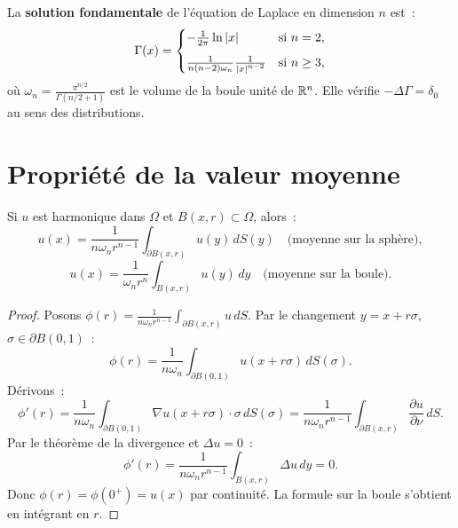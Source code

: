 \begin{theoreme}
La \textbf{solution fondamentale} de l'\'equation de Laplace en dimension $n$
est~:
\begin{equation}\label{eq:sol_fondamentale_laplace}
    \Gamma(x) = \begin{cases}
        -\frac{1}{2\pi}\ln\left| x \right| & \text{si } n = 2,\\[6pt]
        \frac{1}{n(n-2)\omega_n}\frac{1}{\left| x \right|^{n-2}} & \text{si } n \geq 3,
    \end{cases}
\end{equation}
o\`u $\omega_n = \frac{\pi^{n/2}}{\Gamma(n/2+1)}$ est le volume de la boule
unit\'e de $\mathbb{R}^n$. Elle v\'erifie $-\Delta\Gamma = \delta_0$ au sens des
distributions.
\end{theoreme}

\section{Propri\'et\'e de la valeur moyenne}

\begin{theoreme}
Si $u$ est harmonique dans $\Omega$ et $B(x,r) \subset \Omega$, alors~:
\begin{equation}\label{eq:valeur_moyenne_sphere}
    u(x) = \frac{1}{n\omega_n r^{n-1}}\int_{\partial B(x,r)} u(y)\, dS(y)
    \quad \text{(moyenne sur la sph\`ere)},
\end{equation}
\begin{equation}\label{eq:valeur_moyenne_boule}
    u(x) = \frac{1}{\omega_n r^n}\int_{B(x,r)} u(y)\, dy
    \quad \text{(moyenne sur la boule)}.
\end{equation}
\end{theoreme}

\begin{proof}
Posons $\phi(r) = \frac{1}{n\omega_n r^{n-1}}\int_{\partial B(x,r)} u\, dS$.
Par le changement $y = x + r\sigma$, $\sigma \in \partial B(0,1)$~:
\[
    \phi(r) = \frac{1}{n\omega_n}\int_{\partial B(0,1)} u(x+r\sigma)\, dS(\sigma).
\]
D\'erivons~:
\[
    \phi'(r) = \frac{1}{n\omega_n}\int_{\partial B(0,1)}
    \nabla u(x+r\sigma) \cdot \sigma\, dS(\sigma)
    = \frac{1}{n\omega_n r^{n-1}}\int_{\partial B(x,r)}
    \frac{\partial u}{\partial \nu}\, dS.
\]
Par le th\'eor\`eme de la divergence et $\Delta u = 0$~:
\[
    \phi'(r) = \frac{1}{n\omega_n r^{n-1}}\int_{B(x,r)} \Delta u\, dy = 0.
\]
Donc $\phi(r) = \phi(0^+) = u(x)$ par continuit\'e. La formule sur la
boule s'obtient en int\'egrant en $r$.
\end{proof}

